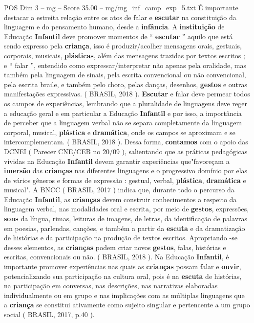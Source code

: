 \begin{textsample}{POS Dim 3 – mg – Score 35.00 – mg/mg\_inf\_camp\_exp\_5.txt}
É importante destacar a estreita relação entre os atos de falar e \textbf{escutar} na constituição da linguagem e do pensamento humano, desde a \textbf{infância}.
A \textbf{instituição} de Educação \textbf{Infantil} deve promover momentos de “ \textbf{escutar} ” aquilo que está sendo expresso pela \textbf{criança}, isso é produzir/acolher mensagens orais, gestuais, corporais, musicais, \textbf{plásticas}, além das mensagens trazidas por textos escritos ; e “ falar ”, entendido como expressar/interpretar não apenas pela oralidade, mas também pela linguagem de sinais, pela escrita convencional ou não convencional, pela escrita braile, e também pelo choro, pelas danças, desenhos, \textbf{gestos} e outras manifestações expressivas. ( BRASIL, 2018 ). \textbf{Escutar} e falar deve permear todos os campos de experiências, lembrando que a pluralidade de linguagens deve reger a educação geral e em particular a Educação \textbf{Infantil} e por isso, a importância de perceber que a linguagem verbal não se separa completamente da linguagem corporal, musical, \textbf{plástica} e \textbf{dramática}, onde os campos se aproximam e se intercomplementam. ( BRASIL, 2018 ).
Dessa forma, \textbf{contamos} com o apoio das DCNEI ( Parecer CNE/CEB no 20/09 ), salientando que as práticas pedagógicas vividas na Educação \textbf{Infantil} devem garantir experiências que"favoreçam a \textbf{imersão} das \textbf{crianças} nas diferentes linguagens e o progressivo domínio por elas de vários gêneros e formas de expressão : gestual, verbal, \textbf{plástica}, \textbf{dramática} e musical".
A BNCC ( BRASIL, 2017 ) indica que, durante todo o percurso da Educação \textbf{Infantil}, as \textbf{crianças} devem construir conhecimentos a respeito da linguagem verbal, nas modalidades oral e escrita, por meio de \textbf{gestos}, expressões, \textbf{sons} da língua, rimas, leituras de imagens, de letras, da identificação de palavras em poesias, parlendas, canções, e também a partir da \textbf{escuta} e da dramatização de histórias e da participação na produção de textos escritos.
Apropriando -se desses elementos, as \textbf{crianças} podem criar novos \textbf{gestos}, falas, histórias e escritas, convencionais ou não. ( BRASIL, 2018 ).
Na Educação \textbf{Infantil}, é importante promover experiências nas quais as \textbf{crianças} possam falar e \textbf{ouvir}, potencializando sua participação na cultura oral, pois é na \textbf{escuta} de histórias, na participação em conversas, nas descrições, nas narrativas elaboradas individualmente ou em grupo e nas implicações com as múltiplas linguagens que a \textbf{criança} se constitui ativamente como sujeito singular e pertencente a um grupo social ( BRASIL, 2017, p.40 ).

\end{textsample}

